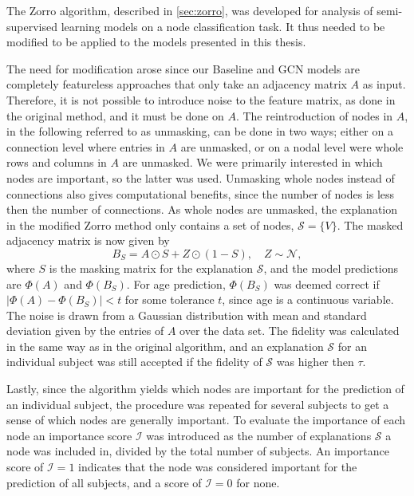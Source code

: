 The Zorro algorithm, described in \cref{sec:zorro}, was developed for analysis of semi-supervised learning models on a node classification task. It thus needed to be modified to be applied to the models presented in this thesis.

The need for modification arose since our Baseline and GCN models are completely featureless approaches that only take an adjacency matrix $A$ as input. Therefore, it is not possible to introduce noise to the feature matrix, as done in the original method, and it must be done on $A$. The reintroduction of nodes in $A$, in the following referred to as unmasking, can be done in two ways; either on a connection level where entries in $A$ are unmasked, or on a nodal level were whole rows and columns in $A$ are unmasked. We were primarily interested in which nodes are important, so the latter was used. Unmasking whole nodes instead of connections also gives computational benefits, since the number of nodes is less then the number of connections. As whole nodes are unmasked, the explanation in the modified Zorro method only contains a set of nodes, $\mathcal{S} = \{V\}$. The masked adjacency matrix is now given by 
\begin{equation*}
    B_S = A \odot S + Z \odot (1- S), \quad Z \sim \mathcal{N},
\end{equation*}
where $S$ is the masking matrix for the explanation $\mathcal{S}$, and the model predictions are $\Phi(A)$ and $\Phi(B_S)$. For age prediction, $\Phi(B_S)$ was deemed correct if $\left|\Phi(A) - \Phi(B_S)\right| < t$ for some tolerance $t$, since age is a continuous variable. The noise is drawn from a Gaussian distribution with mean and standard deviation given by the entries of $A$ over the data set. The fidelity was calculated in the same way as in the original algorithm, and an explanation $\mathcal{S}$ for an individual subject was still accepted if the fidelity of $\mathcal{S}$ was higher then $\tau$. 

Lastly, since the algorithm yields which nodes are important for the prediction of an individual subject, the procedure was repeated for several subjects to get a sense of which nodes are generally important. To evaluate the importance of each node an importance score $\mathcal{I}$ was introduced as the number of explanations $\mathcal{S}$ a node was included in, divided by the total number of subjects. An importance score of $\mathcal{I}=1$ indicates that the node was considered important for the prediction of all subjects, and a score of $\mathcal{I}=0$ for none.  